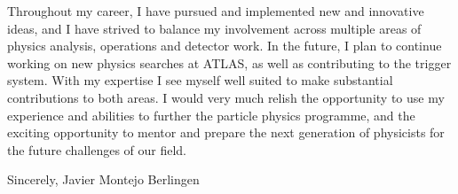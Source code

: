 \documentclass[11pt,a4paper,sans]{moderncv}        %
\begin{document}
Throughout my career, I have pursued and implemented new and innovative ideas, and I have strived to balance my involvement across multiple areas of physics analysis, operations and detector work. 
In the future, I plan to continue working on new physics searches at ATLAS, as well as contributing to the trigger system. 
With my expertise I see myself well suited to make substantial contributions to both areas.
I would very much relish the opportunity to use my experience and abilities to further the particle physics programme, and the exciting opportunity to mentor and prepare the next generation of physicists for the future challenges of our field.
\newline


Sincerely,
\newline
\newline
\newline
Javier Montejo Berlingen
\end{document}
